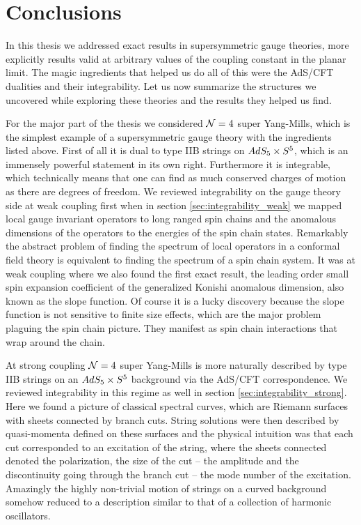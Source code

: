 
\section{Conclusions}

In this thesis we addressed exact results in supersymmetric gauge theories, more explicitly results valid at arbitrary values of the coupling constant in the planar limit.
The magic ingredients that helped us do all of this were the AdS/CFT dualities and their integrability.
Let us now summarize the structures we uncovered while exploring these theories and the results they helped us find.

For the major part of the thesis we considered $\mathcal{N}=4$ super Yang-Mills, which is the simplest example of a supersymmetric gauge theory with the ingredients listed above.
First of all it is dual to type IIB strings on $AdS_5 \times S^5$, which is an immensely powerful statement in its own right.
Furthermore it is integrable, which technically means that one can find as much conserved charges of motion as there are degrees of freedom.
We reviewed integrability on the gauge theory side at weak coupling first when in section \ref{sec:integrability_weak} we mapped local gauge invariant operators to long ranged spin chains and the anomalous dimensions of the operators to the energies of the spin chain states.
Remarkably the abstract problem of finding the spectrum of local operators in a conformal field theory is equivalent to finding the spectrum of a spin chain system.
It was at weak coupling where we also found the first exact result, the leading order small spin expansion coefficient of the generalized Konishi anomalous dimension, also known as the slope function. 
Of course it is a lucky discovery because the slope function is not sensitive to finite size effects, which are the major problem plaguing the spin chain picture.
They manifest as spin chain interactions that wrap around the chain.

At strong coupling $\mathcal{N}=4$ super Yang-Mills is more naturally described by type IIB strings on an $AdS_5 \times S^5$ background via the AdS/CFT correspondence. 
We reviewed integrability in this regime as well in section \ref{sec:integrability_strong}.
Here we found a picture of classical spectral curves, which are Riemann surfaces with sheets connected by branch cuts. 
String solutions were then described by quasi-momenta defined on these surfaces and the physical intuition was that each cut corresponded to an excitation of the string, where the sheets connected denoted the polarization, the size of the cut -- the amplitude and the discontinuity going through the branch cut -- the mode number of the excitation.
Amazingly the highly non-trivial motion of strings on a curved background somehow reduced to a description similar to that of a collection of harmonic oscillators.

